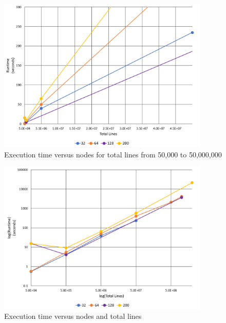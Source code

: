 \begin{figure}
\includegraphics[width=0.9\textwidth]{./images/Runtime1.png}
\caption{Execution time versus nodes for total lines from 50,000 to 50,000,000}
\end{figure}


\begin{figure}
\includegraphics[width=0.9\textwidth]{./images/Runtime2.png}
\caption{Execution time versus nodes and total lines}
\end{figure}

